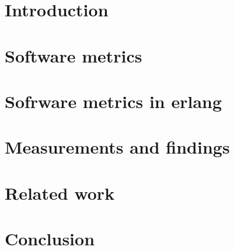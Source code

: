 \documentclass[runningheads,a4paper]{report}
\begin{document}

\begin{abstract}


\end{abstract}

\tableofcontents

\chapter{Introduction}


\chapter{Software metrics}


\chapter{Sofrware metrics in erlang}


\chapter{Measurements and findings}


\chapter{Related work}


\chapter{Conclusion}





  
% 



{}



\end{document}

